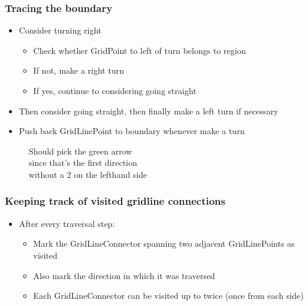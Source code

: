 \documentclass{beamer}
\begin{document}
\begin{frame}
    \frametitle{Tracing the boundary}
    \begin{itemize}
        \item Consider turning right
            \begin{itemize}
                \item Check whether GridPoint to left of turn belongs to region
                \item If not, make a right turn
                \item If yes, continue to considering going straight
            \end{itemize}
        \item Then consider going straight, then finally make a left turn if necessary
        \item Push back GridLinePoint to boundary whenever make a turn
    \end{itemize}
    \centering
    \begin{figure}
        \centering
        \captionsetup{singlelinecheck=false,justification=centering}
        \caption*{Should pick the green arrow \\ since that's the first direction \\ without a 2 on the lefthand side}
    \end{figure}
\end{frame}

\begin{frame}
    \frametitle{Keeping track of visited gridline connections}
    \begin{itemize}
        \item After every traversal step:
            \begin{itemize}
                \item Mark the GridLineConnector spanning two adjacent GridLinePoints as visited
                \item Also mark the direction in which it was traversed
                \item Each GridLineConnector can be visited up to twice (once from each side)
            \end{itemize}
    \end{itemize}
\end{frame}
\end{document}
